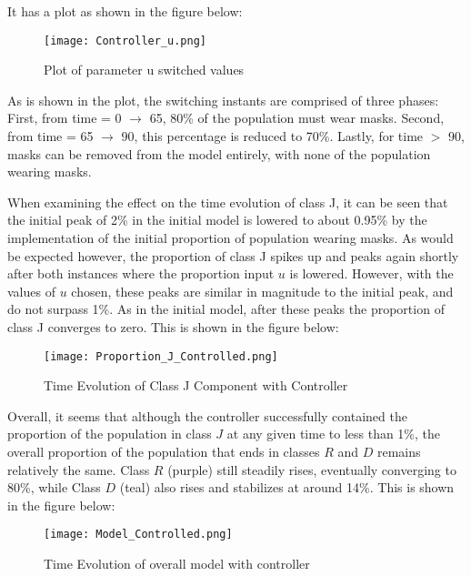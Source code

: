 \documentclass[letterpaper,twocolumn,10pt]{article}
\begin{document}
It has a plot as shown in the figure below:
\begin{figure}[htb!]
\centering
\texttt{[image: Controller\_u.png]}
\caption{Plot of parameter u switched values \label{fig:Controller_u}}
\end{figure}

As is shown in the plot, the switching instants are comprised of three phases: First, from time = 0 \(\rightarrow\) 65, 80\% of the population must wear masks. Second, from time = 65 \(\rightarrow\) 90, this percentage is reduced to 70\%. Lastly, for time \(>\) 90, masks can be removed from the model entirely, with none of the population wearing masks. \hspace*{\fill}
\vspace{3mm}
\linebreak

When examining the effect on the time evolution of class J, it can be seen that the initial peak of 2\% in the initial model is lowered to about 0.95\% by the implementation of the initial proportion of population wearing masks. As would be expected however, the proportion of class J spikes up and peaks again shortly after both instances where the proportion input \(u\) is lowered. However, with the values of \(u\) chosen, these peaks are similar in magnitude to the initial peak, and do not surpass 1\%. As in the initial model, after these peaks the proportion of class J converges to zero. This is shown in the figure below:

\begin{figure}[htb!]
\centering
\texttt{[image: Proportion\_J\_Controlled.png]}
\caption{Time Evolution of Class J Component with Controller \label{fig:Proportion_J_Controlled}}
\end{figure}
\vspace{25mm}
Overall, it seems that although the controller successfully contained the proportion of the population in class \(J\) at any given time to less than 1\%, the overall proportion of the population that ends in classes \(R\) and \(D\) remains relatively the same. Class \(R\) (purple) still steadily rises, eventually converging to 80\%, while Class \(D\) (teal) also rises and stabilizes at around 14\%. This is shown in the figure below:

\begin{figure}[htb!]
\centering
\texttt{[image: Model\_Controlled.png]}
\caption{Time Evolution of overall model with controller \label{fig:Model_Controlled}}
\end{figure}
\vspace{85mm}
\end{document}
